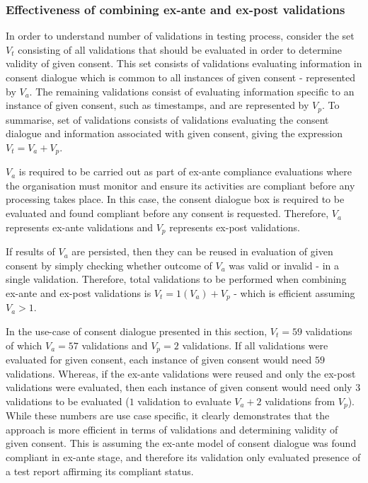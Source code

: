 \subsubsection*{Effectiveness of combining ex-ante and ex-post validations}
In order to understand number of validations in testing process, consider the set $V_{t}$ consisting of all validations that should be evaluated in order to determine validity of given consent. This set consists of validations evaluating information in consent dialogue which is common to all instances of given consent - represented by $V_{a}$. The remaining validations consist of evaluating information specific to an instance of given consent, such as timestamps, and are represented by $V_{p}$. 
To summarise, set of validations consists of validations evaluating the consent dialogue and information associated with given consent, giving the expression $V_{t} = V_{a} + V_{p}$.

$V_{a}$ is required to be carried out as part of ex-ante compliance evaluations where the organisation must monitor and ensure its activities are compliant before any processing takes place. In this case, the consent dialogue box is required to be evaluated and found compliant before any consent is requested. Therefore, $V_{a}$ represents ex-ante validations and $V_{p}$ represents ex-post validations.

If results of $V_{a}$ are persisted, then they can be reused in evaluation of given consent by simply checking whether outcome of $V_{a}$ was valid or invalid - in a single validation. Therefore, total validations to be performed when combining ex-ante and ex-post validations is $V_{t} = 1(V_{a}) + V_{p}$ - which is efficient assuming $V_{a} > 1$.

In the use-case of consent dialogue presented in this section, $V_{t}=59$ validations of which $V_{a}=57$ validations and $V_{p}=2$ validations. If all validations were evaluated for given consent, each instance of given consent would need $59$ validations. Whereas, if the ex-ante validations were reused and only the ex-post validations were evaluated, then each instance of given consent would need only $3$ validations to be evaluated ($1$ validation to evaluate $V_{a} + 2$ validations from $V_{p}$). While these numbers are use case specific, it clearly demonstrates that the approach is more efficient in terms of validations and determining validity of given consent. This is assuming the ex-ante model of consent dialogue was found compliant in ex-ante stage, and therefore its validation only evaluated presence of a test report affirming its compliant status.

